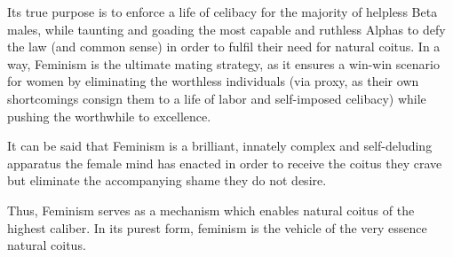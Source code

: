 Its true purpose is to enforce a life of celibacy for the majority of helpless Beta males, while taunting and goading the most capable and ruthless Alphas to defy the law (and common sense) in order to fulfil their need for natural coitus. In a way, Feminism is the ultimate mating strategy, as it ensures a win-win scenario for women by eliminating the worthless individuals (via proxy, as their own shortcomings consign them to a life of labor and self-imposed celibacy) while pushing the worthwhile to excellence.



It can be said that Feminism is a brilliant, innately complex and self-deluding apparatus the female mind has enacted in order to receive the coitus they crave but eliminate the accompanying shame they do not desire.



Thus, Feminism serves as a mechanism which enables natural coitus of the highest caliber. In its purest form, feminism is the vehicle of the very essence natural coitus.
